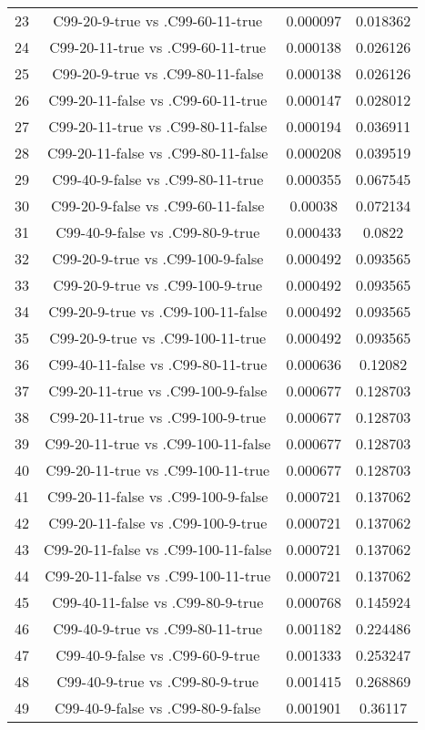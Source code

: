 \documentclass[a4paper,10pt]{article}
\begin{document}
\begin{landscape}
\begin{table}[!htp]
\begin{tabular}{cccc}
23&C99-20-9-true vs .C99-60-11-true&0.000097&0.018362\\
24&C99-20-11-true vs .C99-60-11-true&0.000138&0.026126\\
25&C99-20-9-true vs .C99-80-11-false&0.000138&0.026126\\
26&C99-20-11-false vs .C99-60-11-true&0.000147&0.028012\\
27&C99-20-11-true vs .C99-80-11-false&0.000194&0.036911\\
28&C99-20-11-false vs .C99-80-11-false&0.000208&0.039519\\
29&C99-40-9-false vs .C99-80-11-true&0.000355&0.067545\\
30&C99-20-9-false vs .C99-60-11-false&0.00038&0.072134\\
31&C99-40-9-false vs .C99-80-9-true&0.000433&0.0822\\
32&C99-20-9-true vs .C99-100-9-false&0.000492&0.093565\\
33&C99-20-9-true vs .C99-100-9-true&0.000492&0.093565\\
34&C99-20-9-true vs .C99-100-11-false&0.000492&0.093565\\
35&C99-20-9-true vs .C99-100-11-true&0.000492&0.093565\\
36&C99-40-11-false vs .C99-80-11-true&0.000636&0.12082\\
37&C99-20-11-true vs .C99-100-9-false&0.000677&0.128703\\
38&C99-20-11-true vs .C99-100-9-true&0.000677&0.128703\\
39&C99-20-11-true vs .C99-100-11-false&0.000677&0.128703\\
40&C99-20-11-true vs .C99-100-11-true&0.000677&0.128703\\
41&C99-20-11-false vs .C99-100-9-false&0.000721&0.137062\\
42&C99-20-11-false vs .C99-100-9-true&0.000721&0.137062\\
43&C99-20-11-false vs .C99-100-11-false&0.000721&0.137062\\
44&C99-20-11-false vs .C99-100-11-true&0.000721&0.137062\\
45&C99-40-11-false vs .C99-80-9-true&0.000768&0.145924\\
46&C99-40-9-true vs .C99-80-11-true&0.001182&0.224486\\
47&C99-40-9-false vs .C99-60-9-true&0.001333&0.253247\\
48&C99-40-9-true vs .C99-80-9-true&0.001415&0.268869\\
49&C99-40-9-false vs .C99-80-9-false&0.001901&0.36117\\

\end{tabular}
\end{table}
\end{landscape}
\end{document}
